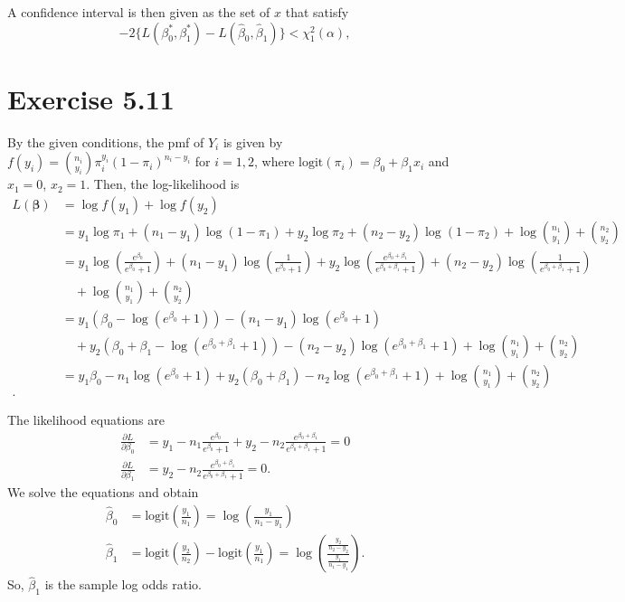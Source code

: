 \documentclass[a4paper]{article}
\begin{document}
A confidence interval is then given as the set of $x$ that satisfy
\[
-2\{L(\beta_0^*,\beta_1^*) - L(\widehat{\beta}_0,\widehat{\beta}_1)\} < \chi_{1}^{2}(\alpha),
\]



\vspace{\baselineskip}
\section{Exercise 5.11}
By the given conditions, the pmf of $Y_i$ is given by $f(y_{i}) = \binom{n_{i}}{y_{i}}\pi_{i}^{y_{i}}(1-\pi_{i})^{n_{i}-y_{i}}$ for $i=1,2$, where  $\mathrm{logit}(\pi_{i}) = \beta_{0} + \beta_{1}x_{i}$
and $x_1=0$, $x_2=1$. Then, the log-likelihood is
\begin{align*}
L(\bm{\beta}) &= \log f(y_{1}) + \log f(y_{2})\\
&= y_{1}\log\pi_{1} + (n_{1}-y_{1})\log(1 -\pi_{1}) + y_{2}\log\pi_{2} + (n_{2}-y_{2})\log(1 -\pi_{2}) + \log\binom{n_{1}}{y_{1}} + \binom{n_{2}}{y_{2}}\\
&= y_{1}\log\left(\frac{e^{\beta_{0}}}{e^{\beta_{0}}+1}\right) + (n_{1}-y_{1})\log\left(\frac{1}{e^{\beta_{0}}+1}\right) + y_{2}\log\left(\frac{e^{\beta_{0}+\beta_{1}}}{e^{\beta_{0}+\beta_{1}}+1}\right) + (n_{2}-y_{2})\log\left(\frac{1}{e^{\beta_{0}+\beta_{1}}+1}\right)\\
&\quad + \log\binom{n_{1}}{y_{1}} + \binom{n_{2}}{y_{2}}\\
&= y_{1}\left(\beta_{0} - \log\left(e^{\beta_{0}}+1\right)\right) - (n_{1}-y_{1}) \log\left(e^{\beta_{0}}+1\right)\\
&\quad + y_{2}\left(\beta_{0}+\beta_{1} - \log\left(e^{\beta_{0}+\beta_{1}}+1\right)\right) - (n_{2}-y_{2}) \log\left(e^{\beta_{0}+\beta_{1}}+1\right) + \log\binom{n_{1}}{y_{1}} + \binom{n_{2}}{y_{2}}\\
&= y_{1}\beta_{0} -n_{1}\log\left(e^{\beta_{0}}+1\right) + y_{2}(\beta_{0}+\beta_{1}) -n_{2}\log\left(e^{\beta_{0}+\beta_{1}}+1\right) + \log\binom{n_{1}}{y_{1}} + \binom{n_{2}}{y_{2}}\\.
\end{align*}

The likelihood equations are
\begin{align*}
\frac{\partial L}{\partial \beta_{0}} &= y_{1} -n_{1}\frac{e^{\beta_{0}}}{e^{\beta_{0}}+1} + y_{2} -n_{2}\frac{e^{\beta_{0}+\beta_{1}}}{e^{\beta_{0}+\beta_{1}}+1} = 0\\
\frac{\partial L}{\partial \beta_{1}} &= y_{2} -n_{2}\frac{e^{\beta_{0}+\beta_{1}}}{e^{\beta_{0}+\beta_{1}}+1} = 0.
\end{align*}
We solve the equations and obtain
\begin{align*}
\widehat{\beta}_{0} &= \mathrm{logit}\left(\frac{y_{1}}{n_{1}}\right) = \log\left(\frac{y_{1}}{n_{1}-y_{1}}\right)\\
\widehat{\beta}_{1} &= \mathrm{logit}\left(\frac{y_{2}}{n_{2}}\right) - \mathrm{logit}\left(\frac{y_{1}}{n_{1}}\right) = \log\left(\frac{\frac{y_{2}}{n_{2}-y_{2}}}{\frac{y_{1}}{n_{1}-y_{1}}}\right).
\end{align*}
So, $\widehat{\beta}_{1}$ is the sample log odds ratio.
\end{document}
